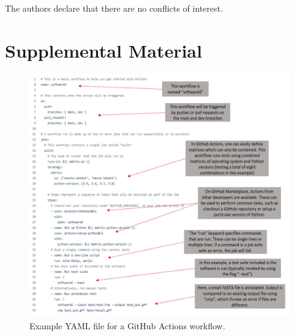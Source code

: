 The authors declare that there are no conflicts of interest.

\section{Supplemental Material}

\begin{figure}[]
\centering
\includegraphics[width=\textwidth]{figures/chapter 8/sup_fig_1.png}
\caption{Example YAML file for a GitHub Actions workflow.}
\label{fig:chap8_sup_figure1}
\end{figure}


